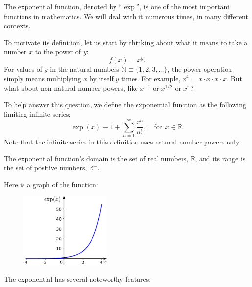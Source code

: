 \documentclass[10pt,a4paper]{article}
\begin{document}
The exponential function, denoted by ``$\exp$'', is one of the most
important functions in mathematics. We will deal with it numerous
times, in many different contexts.

To motivate its definition, let us start by thinking about what it
means to take a number $x$ to the power of $y$:
\begin{equation}
f(x) = x^y.
\end{equation}
For values of $y$ in the natural numbers $\mathbb{N} \equiv
\{1,2,3,\dots\}$, the power operation simply means multiplying $x$ by
itself $y$ times. For example, $x^4 = x \cdot x \cdot x \cdot x$. But
what about non natural number powers, like $x^{-1}$ or $x^{1/2}$ or
$x^{\pi}$?

To help answer this question, we define the exponential function as
the following limiting infinite series:
\begin{equation}
\exp(x) \equiv 1 + \sum_{n=1}^\infty\frac{x^n}{n!}, \quad\mathrm{for}\;\, x \in \mathbb{R}.
\end{equation}
Note that the infinite series in this definition uses natural number
powers only.

The exponential function's domain is the set of real numbers,
$\mathbb{R}$, and its range is the set of positive numbers,
$\mathbb{R}^+$.

\clearpage

Here is a graph of the function:

\begin{figure}[ht]
  \centering\includegraphics[width=0.4\textwidth]{exponential}
\end{figure}

The exponential has several noteworthy features:
\end{document}

